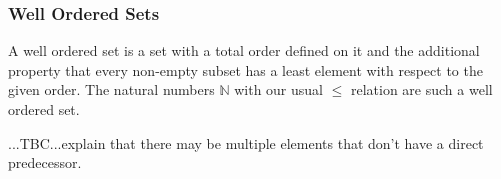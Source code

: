 
%


\subsubsection{Well Ordered Sets} A well ordered set is a set with a total order defined on it and the additional property that every non-empty subset has a least element with respect to the given order. The natural numbers $\mathbb{N}$ with our usual $\leq$ relation are such a well ordered set. 



...TBC...explain that there may be multiple elements that don't have a direct predecessor. 




